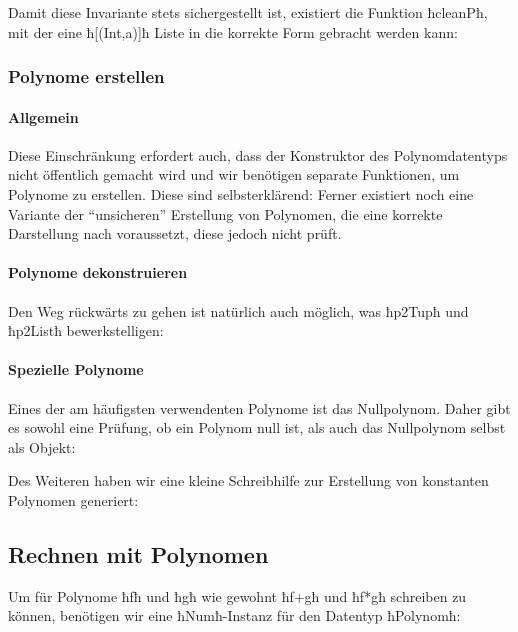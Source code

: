 Damit diese Invariante stets sichergestellt ist, existiert die Funktion
ħcleanPħ, mit der eine ħ[(Int,a)]ħ Liste in die korrekte Form gebracht werden
kann:


\subsubsection{Polynome erstellen}
\paragraph{Allgemein}
Diese Einschränkung erfordert auch, dass der Konstruktor des Polynomdatentyps
nicht öffentlich gemacht wird und wir benötigen separate Funktionen, um
Polynome zu erstellen. Diese sind selbsterklärend:
Ferner existiert noch eine Variante der ``unsicheren'' Erstellung von
Polynomen, die eine korrekte Darstellung nach  voraussetzt,
diese jedoch nicht prüft. 


\paragraph{Polynome dekonstruieren}
Den Weg rückwärts zu gehen ist natürlich auch möglich, was ħp2Tupħ und ħp2Listħ
bewerkstelligen:



\paragraph{Spezielle Polynome}
Eines der am häufigsten verwendenten Polynome ist das Nullpolynom. Daher gibt
es sowohl eine Prüfung, ob ein Polynom null ist, als auch das Nullpolynom
selbst als Objekt:

Des Weiteren haben wir eine kleine Schreibhilfe zur Erstellung von konstanten
Polynomen generiert:


\subsection{Rechnen mit Polynomen}
Um für Polynome ħfħ und ħgħ wie gewohnt ħf+għ und ħf*għ schreiben zu
können, benötigen wir eine ħNumħ-Instanz für den Datentyp ħPolynomħ:





